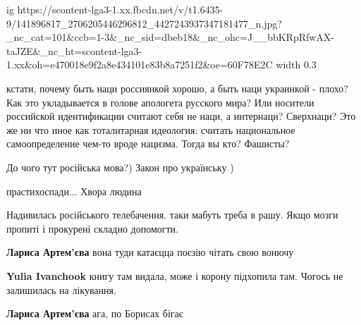 \ifcmt
  ig https://scontent-lga3-1.xx.fbcdn.net/v/t1.6435-9/141896817_2706205446296812_4427243937347181477_n.jpg?_nc_cat=101&ccb=1-3&_nc_sid=dbeb18&_nc_ohc=J__bbKRpRfwAX-taJZE&_nc_ht=scontent-lga3-1.xx&oh=e470018e9f2a8e434101e83b8a7251f2&oe=60F78E2C
  width 0.3
\fi



кстати, почему быть наци россиянкой хорошо, а быть наци украинкой - плохо? Как
это укладывается в голове апологета русского мира? Или носители российской
идентификации считают себя не наци, а интернаци? Сверхнаци? Это же ни что иное
как тоталитарная идеология: считать национальное самоопределение чем-то вроде
нацизма. Тогда вы кто? Фашисты?



До чого тут російська мова?)
Закон про українську )


прастихоспади... Хвора людина


Надивилась російського телебачення. таки мабуть треба в рашу. Якщо мозги пропиті і прокурені складно допомогти.

\begin{itemize}

\textbf{Лариса Артем'єва} вона туди катаєцца поєзію чітать свою вонючу


\textbf{Yulia Ivanchook} книгу там видала, може і корону підхопила там. Чогось не залишилась на лікування.


\textbf{Лариса Артем'єва} ага, по Борисах бігає
\end{itemize}

